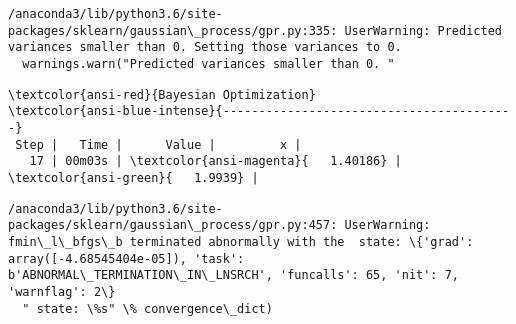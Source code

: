 \documentclass[11pt]{article}
\begin{document}
    \begin{Verbatim}[commandchars=\\\{\}]
/anaconda3/lib/python3.6/site-packages/sklearn/gaussian\_process/gpr.py:335: UserWarning: Predicted variances smaller than 0. Setting those variances to 0.
  warnings.warn("Predicted variances smaller than 0. "

    \end{Verbatim}

    \begin{Verbatim}[commandchars=\\\{\}]
\textcolor{ansi-red}{Bayesian Optimization}
\textcolor{ansi-blue-intense}{-----------------------------------------}
 Step |   Time |      Value |         x | 
   17 | 00m03s | \textcolor{ansi-magenta}{   1.40186} | \textcolor{ansi-green}{   1.9939} | 

    \end{Verbatim}

    \begin{Verbatim}[commandchars=\\\{\}]
/anaconda3/lib/python3.6/site-packages/sklearn/gaussian\_process/gpr.py:457: UserWarning: fmin\_l\_bfgs\_b terminated abnormally with the  state: \{'grad': array([-4.68545404e-05]), 'task': b'ABNORMAL\_TERMINATION\_IN\_LNSRCH', 'funcalls': 65, 'nit': 7, 'warnflag': 2\}
  " state: \%s" \% convergence\_dict)

    \end{Verbatim}

    \begin{center}
    \end{center}
    { \hspace*{\fill} \\}
    
    \begin{center}
    \end{center}
    { \hspace*{\fill} \\}
    
    \begin{center}
    \end{center}
    { \hspace*{\fill} \\}
    
    \begin{center}
    \end{center}
    { \hspace*{\fill} \\}
    
\end{document}
